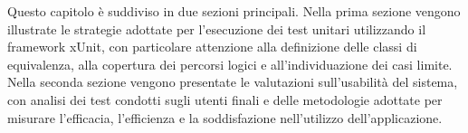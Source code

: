 Questo capitolo è suddiviso in due sezioni principali. Nella prima sezione vengono illustrate le strategie adottate per l’esecuzione dei test unitari utilizzando il framework xUnit, con particolare attenzione alla definizione delle classi di equivalenza, alla copertura dei percorsi logici e all’individuazione dei casi limite. Nella seconda sezione vengono presentate le valutazioni sull’usabilità del sistema, con analisi dei test condotti sugli utenti finali e delle metodologie adottate per misurare l’efficacia, l’efficienza e la soddisfazione nell’utilizzo dell’applicazione.



